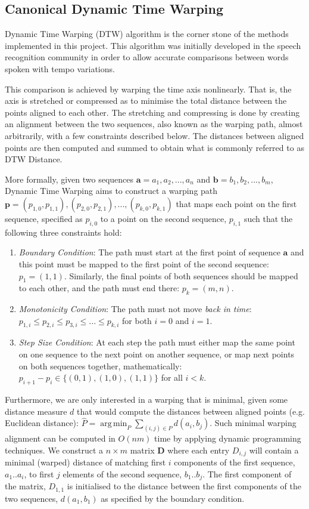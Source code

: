 \documentclass[parskip]{cs4rep}
\DeclareMathOperator*{\argmin}{arg\,min}
\begin{document}
\subsection{Canonical Dynamic Time Warping}

Dynamic Time Warping (DTW) algorithm is the corner stone of the methods implemented in this project. This algorithm was initially developed in the speech recognition community in order to allow accurate comparisons between words spoken with tempo variations. 

This comparison is achieved by warping the time axis nonlinearly. That is, the axis is stretched or compressed as to minimise the total distance between the points aligned to each other. The stretching and compressing is done by creating an alignment between the two sequences, also known as the warping path, almost arbitrarily, with a few constraints described below. The distances between aligned points are then computed and summed to obtain what is commonly referred to as DTW Distance.

More formally, given two sequences $\mathbf{a} = a_1, a_2, ..., a_n$ and $\mathbf{b} = b_1, b_2, ..., b_m$, Dynamic Time Warping aims to construct a warping path $\mathbf{p} = { (p_{1,0}, p_{1,1}), (p_{2,0}, p_{2,1}), ..., (p_{k,0}, p_{k, 1}) }$ that maps each point on the first sequence, specified as $p_{i,0}$ to a point on the second sequence, $p_{i,1}$ such that the following three constraints hold:

\begin{enumerate}
\item \emph{Boundary Condition}: The path must start at the first point of sequence $\mathbf{a}$ and this point must be mapped to the first point of the second sequence: $p_1 = (1,1)$. Similarly, the final points of both sequences should be mapped to each other, and the path must end there: $p_k = (m, n).$ 
\item \emph{Monotonicity Condition}: The path must not move \emph{back in time}: 
    $p_{1,i} \le p_{2,i} \le p_{3,i} \le ... \le p_{k, i}$ for both $i=0$ and $i=1$.
\item \emph{Step Size Condition}: At each step the path must either map the same point on one sequence to the next point on another sequence, or map next points on both sequences together, mathematically:
    $p_{i+1} - p_{i} \in \{(0,1), (1,0), (1,1)\}$ for all $i < k$.
\end{enumerate}

Furthermore, we are only interested in a warping that is minimal, given some distance measure $d$ that would compute the distances between aligned points (e.g. Euclidean distance): $\hat{P} = \argmin_P \sum_{(i,j) \in P} d(a_i, b_j)$. Such minimal warping alignment can be computed in $O(nm)$ time by applying dynamic programming techniques. We construct a $n \times m$ matrix $\mathbf{D}$ where each entry $D_{i,j}$ will contain a minimal (warped) distance of matching first $i$ components of the first sequence, $a_1..a_i$, to first $j$ elements of the second sequence, $b_1..b_j$. The first component of the matrix, $D_{1,1}$ is initialised to the distance between the first components of the two sequences, $d(a_1, b_1)$ as specified by the boundary condition.
\end{document}
